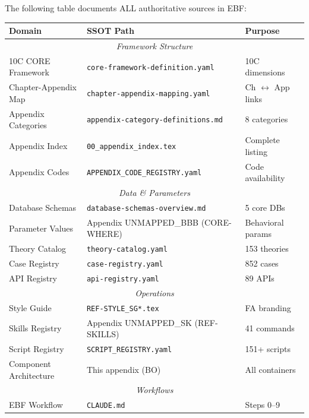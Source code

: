 \begin{tcolorbox}[colback=yellow!5!white, colframe=yellow!75!black,
    title=Complete SSOT Registry]

The following table documents ALL authoritative sources in EBF:

\begin{center}
\small
\begin{tabular}{|l|l|l|}
\hline
\textbf{Domain} & \textbf{SSOT Path} & \textbf{Purpose} \\
\hline
\multicolumn{3}{|c|}{\textit{Framework Structure}} \\
\hline
10C CORE Framework & \texttt{core-framework-definition.yaml} & 10C dimensions \\
Chapter-Appendix Map & \texttt{chapter-appendix-mapping.yaml} & Ch $\leftrightarrow$ App links \\
Appendix Categories & \texttt{appendix-category-definitions.md} & 8 categories \\
Appendix Index & \texttt{00\_appendix\_index.tex} & Complete listing \\
Appendix Codes & \texttt{APPENDIX\_CODE\_REGISTRY.yaml} & Code availability \\
\hline
\multicolumn{3}{|c|}{\textit{Data \& Parameters}} \\
\hline
Database Schemas & \texttt{database-schemas-overview.md} & 5 core DBs \\
Parameter Values & Appendix UNMAPPED_BBB (CORE-WHERE) & Behavioral params \\
Theory Catalog & \texttt{theory-catalog.yaml} & 153 theories \\
Case Registry & \texttt{case-registry.yaml} & 852 cases \\
API Registry & \texttt{api-registry.yaml} & 89 APIs \\
\hline
\multicolumn{3}{|c|}{\textit{Operations}} \\
\hline
Style Guide & \texttt{REF-STYLE\_SG*.tex} & FA branding \\
Skills Registry & Appendix UNMAPPED_SK (REF-SKILLS) & 41 commands \\
Script Registry & \texttt{SCRIPT\_REGISTRY.yaml} & 151+ scripts \\
Component Architecture & This appendix (BO) & All containers \\
\hline
\multicolumn{3}{|c|}{\textit{Workflows}} \\
\hline
EBF Workflow & \texttt{CLAUDE.md} & Steps 0--9 \\
\hline
\end{tabular}
\end{center}

\end{tcolorbox}


